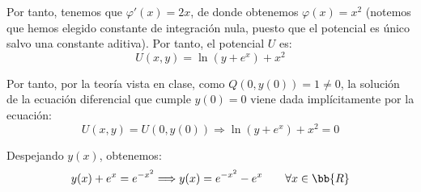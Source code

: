 \documentclass[12pt]{article}
\begin{document}
\begin{ejercicio}
        Por tanto, tenemos que $\varphi'(x) = 2x$, de donde obtenemos $\varphi(x) = x^2$ (notemos que hemos elegido constante de integración nula, puesto que el potencial es único salvo una constante aditiva).
        Por tanto, el potencial $U$ es:
        \begin{equation*}
            U(x,y) = \ln(y+e^x) + x^2
        \end{equation*}

        Por tanto, por la teoría vista en clase, como $Q(0,y(0))=1\neq 0$, la solución de la ecuación diferencial que cumple $y(0)=0$ viene dada implícitamente por la ecuación:
        \begin{equation*}
            U(x,y) = U(0,y(0))\Longrightarrow
            \ln(y+e^x) + x^2 = 0
        \end{equation*}

        Despejando $y(x)$, obtenemos:
        \begin{equation*}
            y(x)+e^x = e^{-x^2}\Longrightarrow y(x) = e^{-x^2}-e^x\qquad \forall x\in\bb{R}
        \end{equation*}
    \end{ejercicio}
\end{document}
